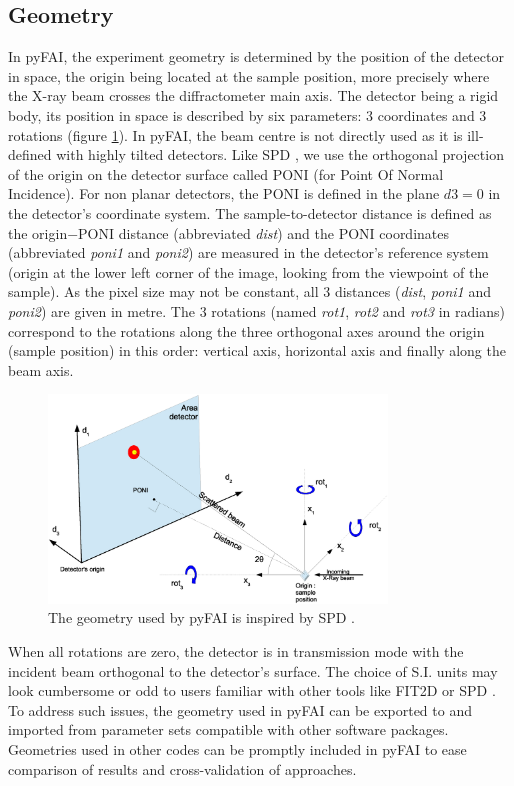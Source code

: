\documentclass{iucr}
\begin{document}
\subsection{Geometry}
In pyFAI, the experiment geometry is determined by the position of the
detector in space, the origin being located at the sample position, more precisely where the
X-ray beam crosses the diffractometer main axis.
The detector being a rigid body, its position in space is described by
six parameters: 3 coordinates and 3 rotations (figure \ref{PONI}).
In pyFAI, the beam centre is not directly used as it is ill-defined with
highly tilted detectors.
Like SPD \cite{spd}, we use the orthogonal projection of the origin on
the detector surface called PONI (for Point Of Normal Incidence).
For non planar detectors, the PONI is defined in the plane $d3=0$ in
the detector's coordinate system.
The sample-to-detector distance is defined as the origin$-$PONI distance
(abbreviated \textit{dist}) and the PONI coordinates (abbreviated
\textit{poni1} and \textit{poni2}) are measured in the detector's reference
system (origin at the lower left corner of the image, looking from the
viewpoint of the sample).
As the pixel size may not be constant, all 3 distances (\textit{dist},
\textit{poni1} and \textit{poni2}) are given in metre.
The 3 rotations (named \textit{rot1}, \textit{rot2} and \textit{rot3} in
radians)
correspond to the rotations along the three orthogonal axes around the origin
(sample position) in this order:
vertical axis, horizontal axis and finally along the beam axis.

\begin{figure}
\label{PONI}
\begin{center}
\includegraphics[width=9cm]{PONI.eps}
\caption{The geometry used by pyFAI is inspired by SPD \cite{spd}.}
\end{center}
\end{figure}

When all rotations are zero, the detector is in transmission mode with the
incident beam orthogonal to the detector's surface.
The choice of S.I. units may look cumbersome or odd to users familiar
with other tools like FIT2D \cite{fit2d} or SPD \cite{spd}.
To address such issues, the geometry used in pyFAI can be
exported to and imported from parameter sets compatible with other software
packages.
Geometries used in other codes can be promptly included in pyFAI to ease
comparison of results and cross-validation of approaches.
\end{document}

